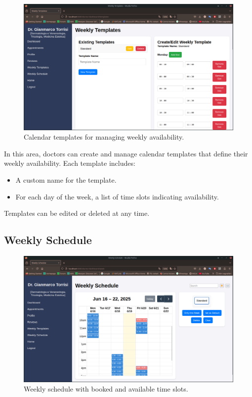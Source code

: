 \begin{figure}
    \centering
    \includegraphics[scale=0.30]{resources/screenshots/doctor_ui/template.png}
    \caption{Calendar templates for managing weekly availability.}
    \label{fig:calendar_templates}
\end{figure}

In this area, doctors can create and manage calendar templates that define their weekly availability. Each template includes:
\begin{itemize}
    \item A custom name for the template.
    \item For each day of the week, a list of time slots indicating availability.
\end{itemize}
Templates can be edited or deleted at any time.

\subsection{Weekly Schedule}

\begin{figure}[!h]
    \centering
    \includegraphics[scale=0.30]{resources/screenshots/doctor_ui/schedule.png}
    \caption{Weekly schedule with booked and available time slots.}
    \label{fig:weekly_schedule}
\end{figure}

